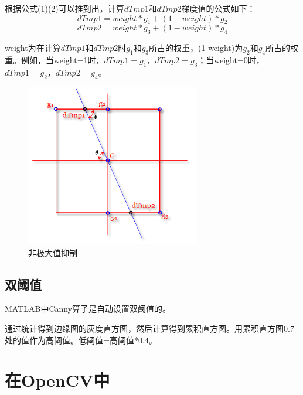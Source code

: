 \documentclass[12pt]{article}
\begin{document}
根据公式(1)(2)可以推到出，计算$dTmp1$和$dTmp2$梯度值的公式如下：
    \begin{equation}
      dTmp1=weight*g_{1}+(1-weight)*g_{2}
    \end{equation}
    \begin{equation}
      dTmp2=weight*g_{3}+(1-weight)*g_{4}
    \end{equation}
    
weight为在计算$dTmp1$和$dTmp2$时$g_{1}$和$g_{3}$所占的权重，(1-weight)为$g_{2}$和$g_{4}$所占的权重。例如，当weight=1时，$dTmp1=g_{1}$，$dTmp2=g_{3}$；当weight=0时，$dTmp1=g_{2}$，$dTmp2=g_{4}$。
    \begin{figure}
    \centering
    \includegraphics[width=3in]{nms2.png}
    \caption{非极大值抑制}
    \label{fig:nms2}
    \end{figure}  




\subsection{双阈值}
MATLAB中Canny算子是自动设置双阈值的。

通过统计得到边缘图的灰度直方图，然后计算得到累积直方图。用累积直方图0.7处的值作为高阈值。低阈值=高阈值*0.4。

\section{在OpenCV中}
\end{document}
